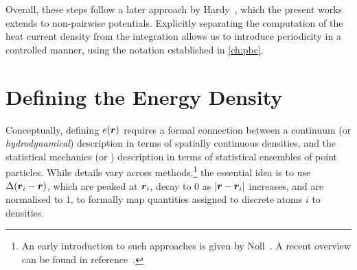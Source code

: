 
Overall, these steps follow a later approach by Hardy~\cite{h1982t}, which the present works extends to non-pairwise potentials. Explicitly separating the computation of the heat current density from the integration allows us to introduce periodicity in a controlled manner, using the notation established in \cref{ch:pbc}.

\clearpage
\section{Defining the Energy Density}
\label{sec:hf_dense}

Conceptually, defining $e(\boldsymbol{r})$ requires a formal connection between a continuum (or \emph{hydrodynamical}) description in terms of spatially continuous densities, and the statistical mechanics (or \md) description in terms of statistical ensembles of point particles.
While details vary across methods,\footnote{An early introduction to such approaches is given by Noll~\cite{n1955t}. A recent overview can be found in reference~\cite{fs2015t}.} the essential idea is to use  $\Delta(\boldsymbol{r}_i - \boldsymbol{r})$, which are peaked at $\boldsymbol{r}_i$, decay to $0$ as $|\boldsymbol{r} - \boldsymbol{r}_i|$ increases, and are normalised to $1$, to formally map quantities assigned to discrete atoms $i$ to densities.

